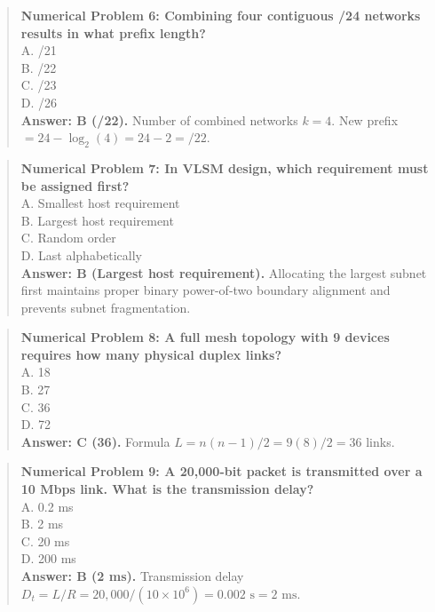 \begin{quote}
\textbf{Numerical Problem 6: Combining four contiguous /24 networks results in what prefix length?}\\[4pt]
\quad A. /21\\[2pt]
\quad B. /22\\[2pt]
\quad C. /23\\[2pt]
\quad D. /26\\[2pt]
\vspace{4pt}
\textbf{Answer: B (/22).} Number of combined networks $k = 4$. New prefix $= 24 - \log_2(4) = 24 - 2 = /22$.
\end{quote}

\begin{quote}
\textbf{Numerical Problem 7: In VLSM design, which requirement must be assigned first?}\\[4pt]
\quad A. Smallest host requirement\\[2pt]
\quad B. Largest host requirement\\[2pt]
\quad C. Random order\\[2pt]
\quad D. Last alphabetically\\[2pt]
\vspace{4pt}
\textbf{Answer: B (Largest host requirement).} Allocating the largest subnet first maintains proper binary power-of-two boundary alignment and prevents subnet fragmentation.
\end{quote}

\begin{quote}
\textbf{Numerical Problem 8: A full mesh topology with 9 devices requires how many physical duplex links?}\\[4pt]
\quad A. 18\\[2pt]
\quad B. 27\\[2pt]
\quad C. 36\\[2pt]
\quad D. 72\\[2pt]
\vspace{4pt}
\textbf{Answer: C (36).} Formula $L = n(n-1)/2 = 9(8)/2 = 36$ links.
\end{quote}

\begin{quote}
\textbf{Numerical Problem 9: A 20,000-bit packet is transmitted over a 10 Mbps link. What is the transmission delay?}\\[4pt]
\quad A. 0.2 ms\\[2pt]
\quad B. 2 ms\\[2pt]
\quad C. 20 ms\\[2pt]
\quad D. 200 ms\\[2pt]
\vspace{4pt}
\textbf{Answer: B (2 ms).} Transmission delay $D_t = L / R = 20,000 / (10 \times 10^6) = 0.002\text{ s} = 2\text{ ms}$.
\end{quote}

